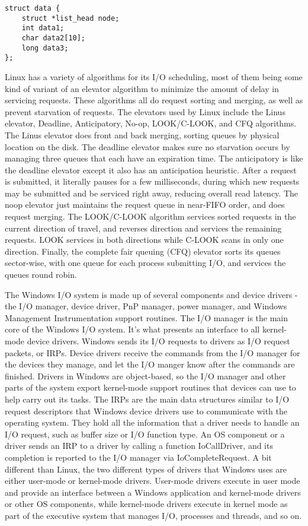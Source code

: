 \documentclass[10pt,draftclsnofoot,onecolumn,letterpaper]{IEEEtran}
\begin{document}
\begin{verbatim}
struct data {
	struct *list_head node;
	int data1;
	char data2[10];
	long data3;
};
\end{verbatim}

Linux has a variety of algorithms for its I/O scheduling, most of them being some kind of variant of an elevator algorithm to minimize the amount of delay in servicing requests. These algorithms all do request sorting and merging, as well as prevent starvation of requests\cite{1}. The elevators used by Linux include the Linus elevator, Deadline, Anticipatory, No-op, LOOK/C-LOOK, and CFQ algorithms.
The Linus elevator does front and back merging, sorting queues by physical location on the disk. The deadline elevator makes sure no starvation occurs by managing three queues that each have an expiration time. The anticipatory is like the deadline elevator except it also has an anticipation heuristic. After a request is submitted, it literally pauses for a few milliseconds, during which new requests may be submitted and be serviced right away, reducing overall read latency\cite{2}. The noop elevator just maintains the request queue in near-FIFO order, and does request merging. The LOOK/C-LOOK algorithm services sorted requests in the current direction of travel, and reverses direction and services the remaining requests. LOOK services in both directions while C-LOOK scans in only one direction. Finally, the complete fair queuing (CFQ) elevator sorts its queues sector-wise, with one queue for each process submitting I/O, and services the queues round robin\cite{2}. 

The Windows I/O system is made up of several components and device drivers - the I/O manager, device driver, PnP manager, power manager, and Windows Management Instrumentation support routines.
The I/O manager is the main core of the Windows I/O system. It's what presents an interface to all kernel-mode device drivers. Windows sends its I/O requests to drivers as I/O request packets, or IRPs\cite{4}. Device drivers receive the commands from the I/O manager for the devices they manage, and let the I/O manger know after the commands are finished. Drivers in Windows are object-based, so the I/O manager and other parts of the system export kernel-mode support routines that devices can use to help carry out its tasks\cite{4}.
The IRPs are the main data structures similar to I/O request descriptors that Windows device drivers use to communicate with the operating system. They hold all the information that a driver needs to handle an I/O request, such as buffer size or I/O function type. An OS component or a driver sends an IRP to a driver by calling a function IoCallDriver, and its completion is reported to the I/O manager via IoCompleteRequest\cite{4}.
A bit different than Linux, the two different types of drivers that Windows uses are either user-mode or kernel-mode drivers. User-mode drivers execute in user mode and provide an interface between a Windows application and kernel-mode drivers or other OS components, while kernel-mode drivers execute in kernel mode as part of the executive system that manages I/O, processes and threads, and so on\cite{3}.
\end{document}
